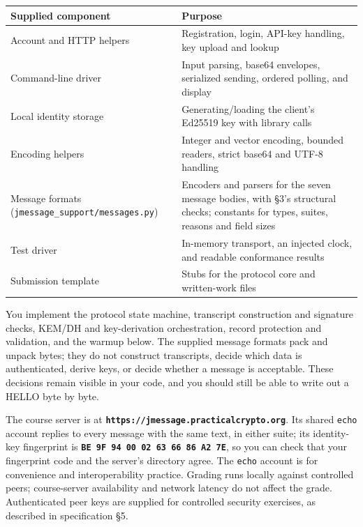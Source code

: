 \documentclass[11pt]{article}
\begin{document}
\begin{center}\small
\begin{tabular}{p{2.33in}p{2.92in}}
\toprule
\textbf{Supplied component} & \textbf{Purpose} \\
\midrule
Account and HTTP helpers & Registration, login, API-key handling, key upload and lookup \\
Command-line driver & Input parsing, base64 envelopes, serialized sending, ordered polling, and display \\
Local identity storage & Generating/loading the client's Ed25519 key with library calls \\
Encoding helpers & Integer and vector encoding, bounded readers, strict base64 and UTF-8 handling \\
Message formats (\texttt{jmessage\_\allowbreak{}support/messages.\allowbreak{}py}) & Encoders and parsers for the seven message bodies, with \S{}3's structural checks; constants for types, suites, reasons and field sizes \\
Test driver & In-memory transport, an injected clock, and readable conformance results \\
Submission template & Stubs for the protocol core and written-work files \\
\bottomrule
\end{tabular}
\end{center}

You implement the protocol state machine, transcript construction and signature checks, KEM/DH and key-derivation orchestration, record protection and validation, and the warmup below. The supplied message formats pack and unpack bytes; they do not construct transcripts, decide which data is authenticated, derive keys, or decide whether a message is acceptable. These decisions remain visible in your code, and you should still be able to write out a HELLO byte by byte.

The course server is at \textbf{\texttt{https://jmessage.\allowbreak{}practicalcrypto.\allowbreak{}org}}. Its shared \texttt{echo} account replies to every message with the same text, in either suite; its identity-key fingerprint is \textbf{\texttt{BE 9F 94 00 02 63 66 86 A2 7E}}, so you can check that your fingerprint code and the server's directory agree. The \texttt{echo} account is for convenience and interoperability practice. Grading runs locally against controlled peers; course-server availability and network latency do not affect the grade. Authenticated peer keys are supplied for controlled security exercises, as described in specification \S{}5.
\end{document}
